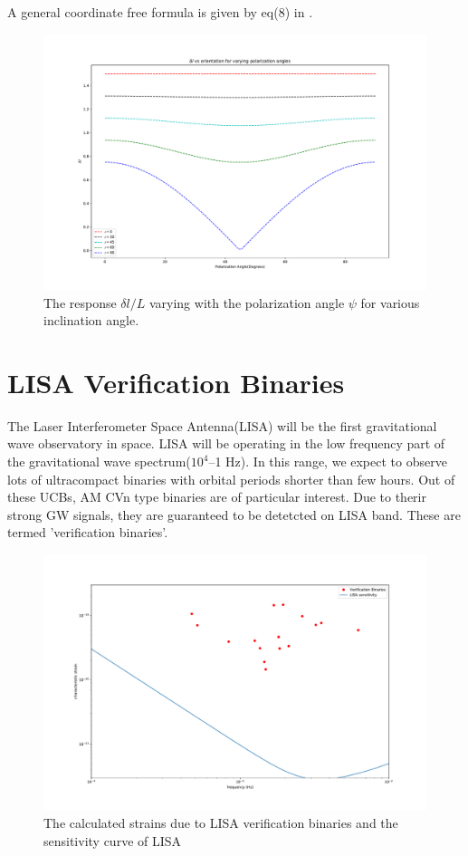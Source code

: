 \documentclass[10pt,a4paper]{article}
\begin{document}
A general coordinate free formula is given by eq(8) in \cite{cornish}.\\
 

\begin{figure}[!h]
\centering
\includegraphics[scale=0.3]{../Figures/responsevsorientationofbinary.pdf}
\caption{The response $\delta l/L$ varying with the polarization
  angle $\psi$ for various inclination angle.\label{fig:resporient}}
\end{figure}


\section*{LISA Verification Binaries}
The Laser Interferometer Space Antenna(LISA) will be the first gravitational wave observatory in space. LISA will be operating in the low frequency part of the gravitational wave spectrum($10^4$--1 Hz). In this range, we expect to observe lots of ultracompact binaries with orbital periods shorter than few hours. Out of these UCBs, AM CVn type binaries are of particular interest. Due to therir strong GW signals, they are guaranteed to be  detetcted on LISA band. These are termed 'verification binaries'.


\begin{figure}[ht]
\centering
\includegraphics[scale=0.25]{../Figures/strain_verific_binary.pdf}
\caption{The calculated strains due to LISA verification binaries and the sensitivity curve of LISA}
\end{figure}
\end{document}
